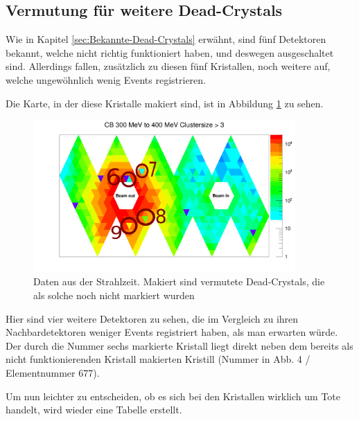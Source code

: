 \documentclass[a4paper,11pt,oneside,final,german,openbib,pdftex]{scrbook}
\begin{document}
{\begin{figure}[h!]
\end{figure}
\newpage

\subsection{Vermutung f\"ur weitere Dead-Crystals}

Wie in Kapitel \ref{sec:Bekannte-Dead-Crystals} erw\"ahnt, sind f\"unf Detektoren bekannt, welche nicht richtig funktioniert haben, und deswegen ausgeschaltet sind. Allerdings fallen, zus\"atzlich zu diesen f\"unf Kristallen, noch weitere auf, welche ungew\"ohnlich wenig Events registrieren.

Die Karte, in der diese Kristalle makiert sind, ist in Abbildung \ref{fig:Vermutete-Dead-Crystals-Map} zu sehen.

\begin{figure}[h!]
	\begin{center}
		\includegraphics[width=100mm]{NewCalib/Strahlzeit2014/ClusterSizeNew/20172504StrahlzeitMoreDead}
	\end{center}
\caption[Strahlzeit: Symmetrische Photonen; Vermutliche Dead-Crystals]{Daten aus der Strahlzeit. Makiert sind vermutete Dead-Crystals, die als solche noch nicht markiert wurden}
\label{fig:Vermutete-Dead-Crystals-Map}

\end{figure}

 Hier sind vier weitere Detektoren zu sehen, die im Vergleich zu ihren Nachbardetektoren weniger Events registriert haben, als man erwarten w\"urde. Der durch die Nummer sechs markierte Kristall liegt direkt neben dem bereits als nicht funktionierenden Kristall makierten Kristill (Nummer in Abb. 4 / Elementnummer 677). 
 
 Um nun leichter zu entscheiden, ob es sich bei den Kristallen wirklich um Tote handelt, wird wieder eine Tabelle erstellt.
 
 
 \begin{table}[h!]
 \begin{center}
 	

\end{center}
\end{table}}
\end{document}
